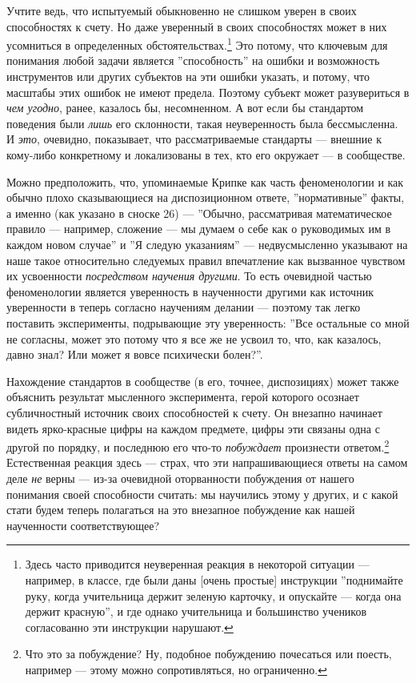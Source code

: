 \documentclass[11pt]{book}
\begin{document}
Учтите ведь, что испытуемый обыкновенно не слишком уверен в своих способностях к счету. Но даже уверенный в своих способностях может в них усомниться в определенных обстоятельствах.\footnote{Здесь часто приводится неуверенная реакция в некоторой ситуации --- например, в классе, где были даны [очень простые] инструкции ''поднимайте руку, когда учительница держит зеленую карточку, и опускайте --- когда она держит красную'', и где однако учительница и большинство учеников согласованно эти инструкции нарушают.} Это потому, что ключевым для понимания любой задачи является ''способность'' на ошибки и возможность инструментов или других субъектов на эти ошибки указать, и потому, что масштабы этих ошибок не имеют предела. Поэтому субъект может разувериться в \textit{чем угодно}, ранее, казалось бы, несомненном. А вот если бы стандартом поведения были \textit{лишь} его склонности, такая неуверенность была бессмысленна. И \textit{это}, очевидно, показывает, что рассматриваемые стандарты --- внешние к кому-либо конкретному и локализованы в тех, кто его окружает --- в сообществе.

Можно предположить, что, упоминаемые Крипке как часть феноменологии и как обычно плохо сказывающиеся на диспозиционном ответе, ''нормативные'' факты, а именно (как указано в сноске 26) --- ''Обычно, рассматривая математическое правило --- например, сложение --- мы думаем о себе как о руководимых им в каждом новом случае'' и ''Я следую указаниям'' --- недвусмысленно указывают на наше такое относительно следуемых правил впечатление как вызванное чувством их усвоенности \textit{посредством научения другими}. То есть очевидной частью феноменологии является уверенность в наученности другими как источник уверенности в теперь согласно научениям делании --- поэтому так легко поставить эксперименты, подрывающие эту уверенность: ''Все остальные со мной не согласны, может это потому что я все же не усвоил то, что, как казалось, давно знал? Или может я вовсе психически болен?''.

Нахождение стандартов в сообществе (в его, точнее, диспозициях) может также объяснить результат мысленного эксперимента, герой которого осознает субличностный источник своих способностей к счету. Он внезапно начинает видеть ярко-красные цифры на каждом предмете, цифры эти связаны одна с другой по порядку, и последнюю его что-то \textit{побуждает} произнести ответом.\footnote{Что это за побуждение? Ну, подобное побуждению почесаться или поесть, например --- этому можно сопротивляться, но ограниченно.} Естественная реакция здесь --- страх, что эти напрашивающиеся ответы на самом деле \textit{не} верны --- из-за очевидной оторванности побуждения от нашего понимания своей способности считать: мы научились этому у других, и с какой стати будем теперь полагаться на это внезапное побуждение как нашей наученности соответствующее?
\end{document}

